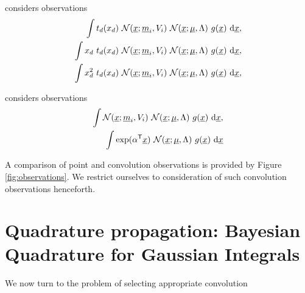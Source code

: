 \documentclass[twoside]{article}
\begin{document}
\ep considers observations
\begin{align}
 \int t_d(x_d)~\N{\vx}{\vm_i}{V_i}~\N{\vx}{\vmu}{\Lambda}~g(\vx)~\ud \vx,\\
  \int x_d~t_d(x_d)~\N{\vx}{\vm_i}{V_i}~\N{\vx}{\vmu}{\Lambda}~g(\vx)~\ud \vx,\\
 \int x_d^2~t_d(x_d)~\N{\vx}{\vm_i}{V_i}~\N{\vx}{\vmu}{\Lambda}~g(\vx)~\ud \vx,
\end{align}

\vb \citep{Gibbs_MacKay97b} considers observations
\begin{align}
 \int \N{\vx}{\vm_i}{V_i}~\N{\vx}{\vmu}{\Lambda}~g(\vx)~\ud \vx,\\
\int \exp(\alpha\tra \vx)~\N{\vx}{\vmu}{\Lambda}~g(\vx)~\ud \vx
\end{align}



A comparison of point and convolution observations is provided by Figure \ref{fig:observations}. 
We restrict ourselves to consideration of such convolution observations henceforth.


\section{Quadrature propagation: Bayesian Quadrature for Gaussian Integrals}
\label{sec:active}

We now turn to the problem of selecting appropriate convolution 



\end{document}
